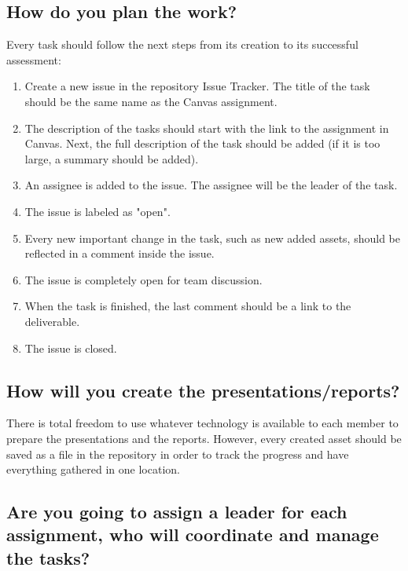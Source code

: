 \documentclass{article}
\begin{document}
\subsection{How do you plan the work?}

Every task should follow the next steps from its creation to its successful assessment:

\begin{enumerate}
    \item Create a new issue in the repository Issue Tracker. The title of the task should be the same name as the Canvas assignment.
    \item The description of the tasks should start with the link to the assignment in Canvas. Next, the full description of the task should be added (if it is too large, a summary should be added).
    \item An assignee is added to the issue. The assignee will be the leader of the task.
    \item The issue is labeled as "open".
    \item Every new important change in the task, such as new added assets, should be reflected in a comment inside the issue. 
    \item The issue is completely open for team discussion.
    \item When the task is finished, the last comment should be a link to the deliverable.
    \item The issue is closed.
\end{enumerate}

    

\subsection{How will you create the presentations/reports?}

There is total freedom to use whatever technology is available to each member to prepare the presentations and the reports. However, every created asset should be saved as a file in the repository in order to track the progress and have everything gathered in one location.


\subsection{Are you going to assign a leader for each assignment, who will coordinate and manage the tasks?}
\end{document}
